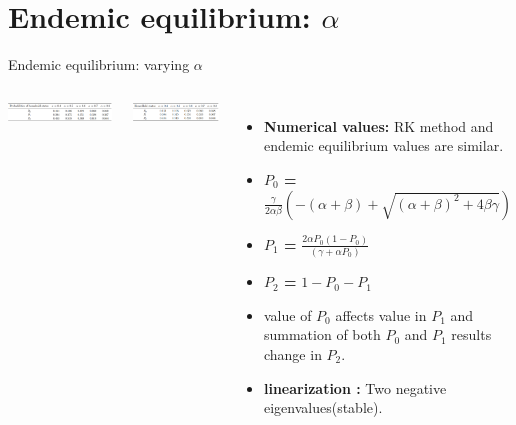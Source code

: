 \documentclass[smaller,aspectratio=169, toc=bibliography]{beamer}
\begin{document}
\section*{Endemic equilibrium: $\alpha$}
\begin{frame}{Endemic equilibrium: varying $\alpha$}
\begin{columns}[c]
\begin{center}
\includegraphics[width=\linewidth]{screenshot/10alphaRK_PK.png}
\caption{Runge-Kutta Method: $\alpha$} 
\end{center}
\begin{center}
\includegraphics[width=\linewidth]{screenshot/13alphaEE_PK.png}
\caption{Equilibrium: $\alpha$} 
\end{center}
\begin{itemize}
\item \textbf{Numerical values: } RK method and endemic equilibrium values are similar.
 
\item \textbf{$P_0$ = } \( \frac{\gamma}{2\alpha\beta}(-( \alpha + \beta ) + \sqrt{( \alpha + \beta )^2 + 4\beta\gamma}) \)
\item \textbf{$P_1$ = } \( \frac{2\alpha P_0(1 - P_0)}{(\gamma + \alpha P_0 )}\) 
\item \textbf{$P_2$ = } $1 - P_0 - P_1$ 
\item value of $P_0$ affects value in $P_1$ and summation of both $P_0$ and $P_1$ results change in $P_2$. 
\item \textbf{linearization : } Two negative eigenvalues(stable). 
\end{itemize}
\end{columns}
\end{frame}
\end{document}
